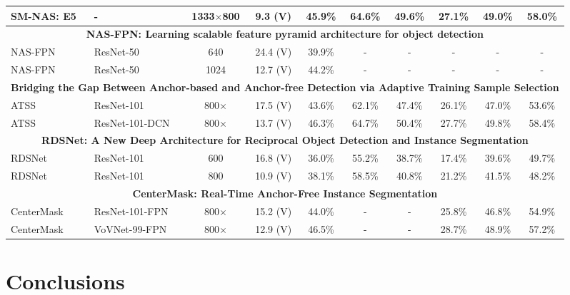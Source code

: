 \documentclass[10pt,twocolumn,letterpaper]{article}
\begin{document}
\begin{table*}[h]
\begin{threeparttable}[h]
\begin{tabular}{llcccccccc}
			SM-NAS: E5 & - & 1333$\times$800 & 9.3 (V) & 45.9\% & 64.6\% & 49.6\% & 27.1\% & 49.0\% & 58.0\% \\
			\midrule
			\multicolumn{10}{c}{\textbf{NAS-FPN: Learning scalable feature pyramid architecture for object detection} \cite{ghiasi2019fpn}} \\
			NAS-FPN & ResNet-50 & 640 & 24.4 (V) & 39.9\% & - & - & - & - & - \\
			NAS-FPN & ResNet-50 & 1024 & 12.7 (V) & 44.2\% & - & - & - & - & - \\
			\midrule
			\multicolumn{10}{c}{\textbf{Bridging the Gap Between Anchor-based and Anchor-free Detection via Adaptive Training Sample Selection \cite{zhang2019bridging}}} \\
			ATSS & ResNet-101 & 800$\times$ & 17.5 (V) & 43.6\% & 62.1\% & 47.4\% & 26.1\% & 47.0\% & 53.6\% \\
			ATSS & ResNet-101-DCN & 800$\times$ & 13.7 (V) & 46.3\% & 64.7\% & 50.4\% & 27.7\% & 49.8\% & 58.4\% \\
			\midrule
			\multicolumn{10}{c}{\textbf{RDSNet: A New Deep Architecture for Reciprocal Object Detection and Instance Segmentation \cite{wang2019rdsnet}}} \\
			RDSNet & ResNet-101 & 600 & 16.8 (V) & 36.0\% & 55.2\% & 38.7\% & 17.4\% & 39.6\% & 49.7\% \\
			RDSNet & ResNet-101 & 800 & 10.9 (V) & 38.1\% & 58.5\% & 40.8\% & 21.2\% & 41.5\% & 48.2\% \\
			\midrule
			\multicolumn{10}{c}{\textbf{CenterMask: Real-Time Anchor-Free Instance Segmentation \cite{lee2019centermask}}} \\
			CenterMask & ResNet-101-FPN & 800$\times$ & 15.2 (V) & 44.0\% & - & - & 25.8\% & 46.8\% & 54.9\% \\
			CenterMask & VoVNet-99-FPN & 800$\times$ & 12.9 (V) & 46.5\% & - & - & 28.7\% & 48.9\% & 57.2\% \\
			\bottomrule
		\end{tabular}
	\end{threeparttable}
\end{table*}



\section{Conclusions}
\end{document}
